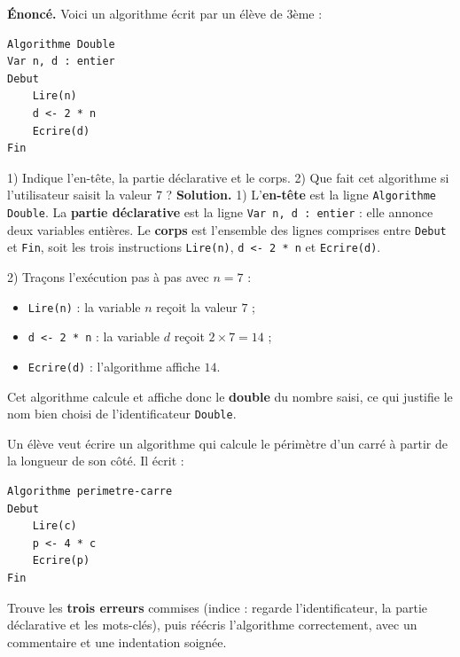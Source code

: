\documentclass[11pt]{article}
\begin{document}
\begin{exoresolu}
\textbf{Énoncé.} Voici un algorithme écrit par un élève de 3ème :
\begin{lstlisting}
Algorithme Double
Var n, d : entier
Debut
    Lire(n)
    d <- 2 * n
    Ecrire(d)
Fin
\end{lstlisting}
1) Indique l'en-tête, la partie déclarative et le corps. 2) Que fait cet algorithme si l'utilisateur saisit la valeur 7 ?
\tcblower
\textbf{Solution.}
1) L'\textbf{en-tête} est la ligne \texttt{Algorithme Double}. La \textbf{partie déclarative} est la ligne \texttt{Var n, d : entier} : elle annonce deux variables entières. Le \textbf{corps} est l'ensemble des lignes comprises entre \texttt{Debut} et \texttt{Fin}, soit les trois instructions \texttt{Lire(n)}, \texttt{d <- 2 * n} et \texttt{Ecrire(d)}.

2) Traçons l'exécution pas à pas avec $n = 7$ :
\begin{itemize}
    \item \texttt{Lire(n)} : la variable $n$ reçoit la valeur $7$ ;
    \item \texttt{d <- 2 * n} : la variable $d$ reçoit $2 \times 7 = 14$ ;
    \item \texttt{Ecrire(d)} : l'algorithme affiche $14$.
\end{itemize}
Cet algorithme calcule et affiche donc le \textbf{double} du nombre saisi, ce qui justifie le nom bien choisi de l'identificateur \texttt{Double}.
\end{exoresolu}

\begin{exercice}
Un élève veut écrire un algorithme qui calcule le périmètre d'un carré à partir de la longueur de son côté. Il écrit :
\begin{lstlisting}
Algorithme perimetre-carre
Debut
    Lire(c)
    p <- 4 * c
    Ecrire(p)
Fin
\end{lstlisting}
Trouve les \textbf{trois erreurs} commises (indice : regarde l'identificateur, la partie déclarative et les mots-clés), puis réécris l'algorithme correctement, avec un commentaire et une indentation soignée.
\end{exercice}
\end{document}
